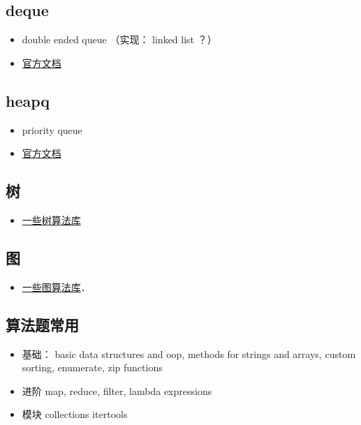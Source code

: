 
\begin{issues}
\issueDraft
\end{issues}

\subsection{deque}
\begin{itemize}
\item double ended queue （实现： linked list ？）
\item \href{https://docs.python.org/3/library/collections.html}{官方文档}
\end{itemize}

\subsection{heapq}
\begin{itemize}
\item priority queue
\item \href{https://docs.python.org/3/library/heapq.html}{官方文档}
\end{itemize}

\subsection{树}
\begin{itemize}
\item \href{https://stackoverflow.com/questions/2442014/tree-libraries-in-python}{一些树算法库}
\end{itemize}


\subsection{图}
\begin{itemize}
\item \href{https://wiki.python.org/moin/PythonGraphLibraries}{一些图算法库}．
\end{itemize}

\subsection{算法题常用}
\begin{itemize}
\item 基础： basic data structures and oop, methods for strings and arrays, custom sorting, enumerate, zip functions
\item 进阶 map, reduce, filter, lambda expressions
\item 模块 collections itertools
\end{itemize}
